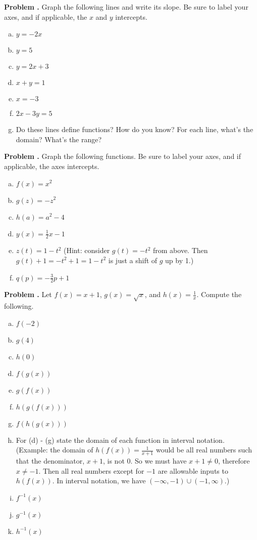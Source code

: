 \documentclass[11pt,letterpaper]{article}
\newcounter{problem}
\newcommand{\problem}{
	\stepcounter{problem}%
	\noindent \textbf{Problem \theproblem. }%
}
\begin{document}
\newpage


\problem Graph the following lines and write its slope. Be sure to label your axes, and if applicable, the $x$ and $y$ intercepts. \\
\begin{enumerate}[(a)]
	\item $y = -2x$
	\item $y = 5$
	\item $y = 2x + 3$
	\item $x + y = 1$
	\item $x = -3$
	\item $2x - 3y = 5$
	\item Do these lines define functions? How do you know? For each line, what's the domain? What's the range?
\end{enumerate} 

\vspace{.5cm}


\problem Graph the following functions. Be sure to label your axes, and if applicable, the axes intercepts. \\
\begin{enumerate}[(a)]
	\item $f(x) = x^2$
	\item $g(z) = -z^2$
	\item $h(a) = a^2 - 4$
	\item $y(x) = \frac{1}{2}x - 1$
	\item $z(t) = 1 - t^2$ (Hint: consider $g(t) = -t^2$ from above. Then $g(t) + 1 = -t^2 + 1 = 1 - t^2$ is just a shift of $g$ up by 1.)
	\item $q(p) = -\frac{3}{2}p + 1$
\end{enumerate}

\vspace{.5cm}

\problem Let $f(x) = x + 1$, $g(x) = \sqrt{x}$, and $h(x) = \frac{1}{x}$. Compute the following.\\
\begin{enumerate}[(a)]
	\item $f(-2)$
	\item $g(4)$
	\item $h(0)$
	\item $f(g(x))$
	\item $g(f(x))$
	\item $h(g(f(x)))$
	\item $f(h(g(x)))$
	\item For (d) - (g) state the domain of each function in interval notation. (Example: the domain of $h(f(x)) = \frac{1}{x+1}$ would be all real numbers such that the denominator, $x+1$, is not $0$. So we must have $x+1 \not = 0$, therefore $x \not = -1$. Then all real numbers except for $-1$ are allowable inputs to $h(f(x))$. In interval notation, we have $(-\infty, -1) \cup (-1, \infty)$.)
	\item $f^{-1}(x)$
	\item $g^{-1}(x)$
	\item $h^{-1}(x)$
\end{enumerate}
\end{document}
